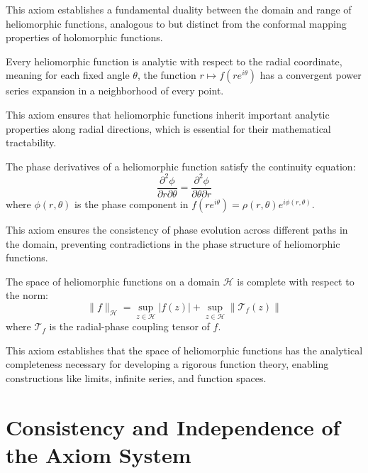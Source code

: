 This axiom establishes a fundamental duality between the domain and range of heliomorphic functions, analogous to but distinct from the conformal mapping properties of holomorphic functions.

\begin{axiom}
Every heliomorphic function is analytic with respect to the radial coordinate, meaning for each fixed angle $\theta$, the function $r \mapsto f(re^{i\theta})$ has a convergent power series expansion in a neighborhood of every point.
\end{axiom}

This axiom ensures that heliomorphic functions inherit important analytic properties along radial directions, which is essential for their mathematical tractability.

\begin{axiom}
The phase derivatives of a heliomorphic function satisfy the continuity equation:
\begin{equation}
\frac{\partial^2 \phi}{\partial r \partial \theta} = \frac{\partial^2 \phi}{\partial \theta \partial r}
\end{equation}
where $\phi(r,\theta)$ is the phase component in $f(re^{i\theta}) = \rho(r,\theta)e^{i\phi(r,\theta)}$.
\end{axiom}

This axiom ensures the consistency of phase evolution across different paths in the domain, preventing contradictions in the phase structure of heliomorphic functions.

\begin{axiom}[Completeness]
The space of heliomorphic functions on a domain $\mathcal{H}$ is complete with respect to the norm:
\begin{equation}
\|f\|_{\mathcal{H}} = \sup_{z \in \mathcal{H}} |f(z)| + \sup_{z \in \mathcal{H}} \|\mathcal{T}_f(z)\|
\end{equation}
where $\mathcal{T}_f$ is the radial-phase coupling tensor of $f$.
\end{axiom}

This axiom establishes that the space of heliomorphic functions has the analytical completeness necessary for developing a rigorous function theory, enabling constructions like limits, infinite series, and function spaces.

\section{Consistency and Independence of the Axiom System}

